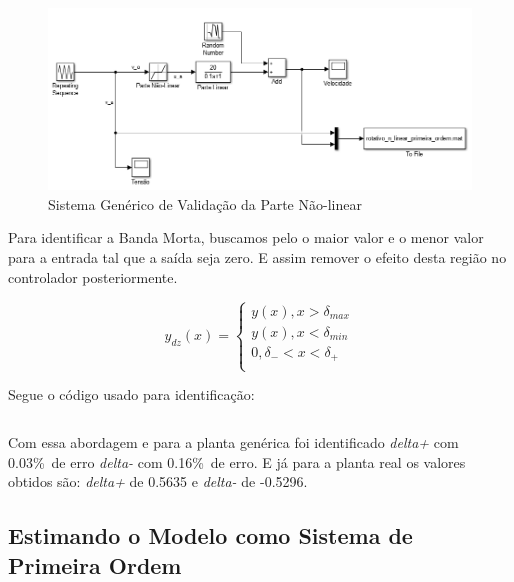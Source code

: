 \documentclass[a4paper,11pt]{article}
\begin{document}
\begin{figure}[H]
    \centering
    \includegraphics[width=1.0\linewidth]{tex/img/Sistema_Generico.png}
    \caption{Sistema Genérico de Validação da Parte Não-linear}
    \label{fig:sistema_generico_nlinear}
\end{figure}

Para identificar a Banda Morta, buscamos pelo o maior valor e o menor valor para a entrada tal que a saída seja zero. E assim remover o efeito desta região no controlador posteriormente.

\begin{equation}
    y_{dz}(x) = 
    \left\{\begin{array}{c}
    y(x), x > \delta_{max} \\
    y(x), x < \delta_{min} \\
    0, \delta_{-} < x < \delta_{+} \\
\end{array} \right.
\end{equation}

Segue o código usado para identificação:

\inputminted[frame=single,framesep=10pt]{matlab}{../src/matlab/deadzoneindetify.m}


Com essa abordagem e para a planta genérica foi identificado \textit{delta+} com 0.03\%\ de erro \textit{delta-} com 0.16\%\ de erro. E já para a planta real os valores obtidos são: \textit{delta+} de 0.5635 e \textit{delta-} de -0.5296.


\subsection{Estimando o Modelo como Sistema de Primeira Ordem}
\end{document}

